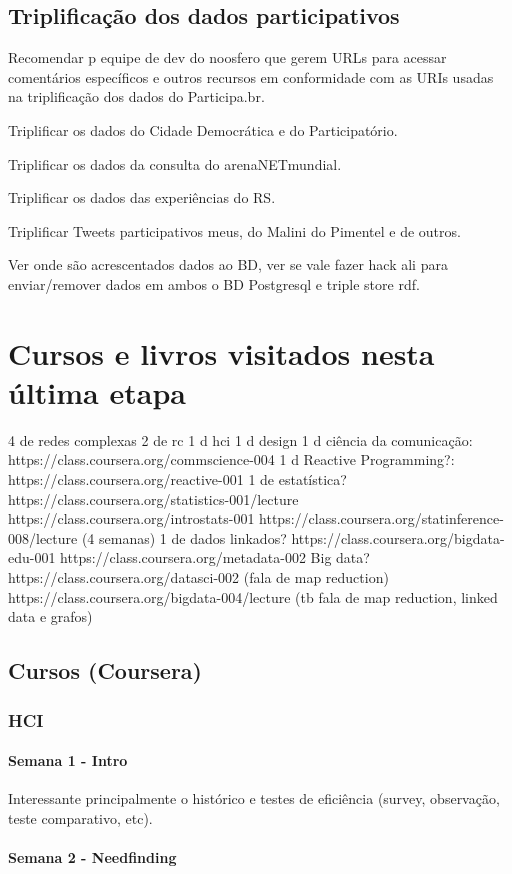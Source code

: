 \documentclass[12pt]{report}
\begin{document}
\chapter{Triplificação dos dados participativos}
Recomendar p equipe de dev do noosfero que gerem URLs para acessar comentários específicos e outros recursos em conformidade com as URIs usadas na triplificação dos dados do Participa.br.

Triplificar os dados do Cidade Democrática e do Participatório.

Triplificar os dados da consulta do arenaNETmundial.

Triplificar os dados das experiências do RS.

Triplificar Tweets participativos meus, do Malini do Pimentel e de outros.

Ver onde são acrescentados dados ao BD, ver se vale fazer hack ali para enviar/remover dados em ambos o BD Postgresql e triple store rdf.

\part{Cursos e livros visitados nesta última etapa}
4 de redes complexas
2 de rc
1 d hci
1 d design
1 d ciência da comunicação:
https://class.coursera.org/commscience-004
1 d Reactive Programming?:
https://class.coursera.org/reactive-001
1 de estatística?
https://class.coursera.org/statistics-001/lecture
https://class.coursera.org/introstats-001
https://class.coursera.org/statinference-008/lecture (4 semanas)
1 de dados linkados?
https://class.coursera.org/bigdata-edu-001
https://class.coursera.org/metadata-002
Big data?
https://class.coursera.org/datasci-002 (fala de map reduction)
https://class.coursera.org/bigdata-004/lecture (tb fala de map reduction, linked data e grafos)
\chapter{Cursos (Coursera)}
\section{HCI}
\subsection{Semana 1 - Intro}
Interessante principalmente o histórico e testes de eficiência (survey, observação, teste comparativo, etc).
\subsection{Semana 2 - Needfinding}
\end{document}
